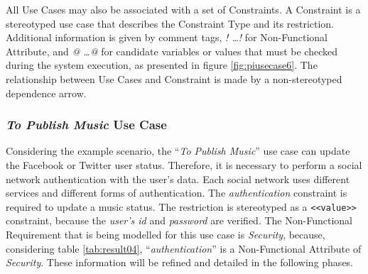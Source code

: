 All {\sc Use Cases} may also be associated with a set of {\sc Constraints}. A
{\sc Constraint} is a stereotyped use case that describes the {\sc Constraint Type} and its
restriction. Additional information is given by comment tags, \textit{!
\ldots !} for {\sc Non-Functional Attribute}, and \textit{@
\ldots @} for candidate variables or values that must be checked during the
system execution, as presented in figure \ref{fig:piusecase6}. The relationship
between {\sc Use Cases} and  {\sc Constraint} is made by a non-stereotyped
dependence arrow.


 
\subsubsection{\textit{To Publish Music} Use Case}

Considering the example scenario, the ``\textit{To Publish Music}'' use case can
update the Facebook or Twitter user status. Therefore, it is necessary to
perform a social network authentication with the user's data. Each social
network uses different services and different forms of authentication. The
\textit{authentication} constraint is required to update a music status. The
restriction is stereotyped as a \texttt{<<value>>} constraint, because the
\textit{user's id} and \textit{password} are verified. The {\sc Non-Functional
Requirement} that is being modelled for this use case is \textit{Security},
because, considering  table \ref{tab:result04}, ``\textit{authentication}'' is
a {\sc Non-Functional Attribute} of \textit{Security}. These information will be
refined and detailed in the following phases.

 
% 




